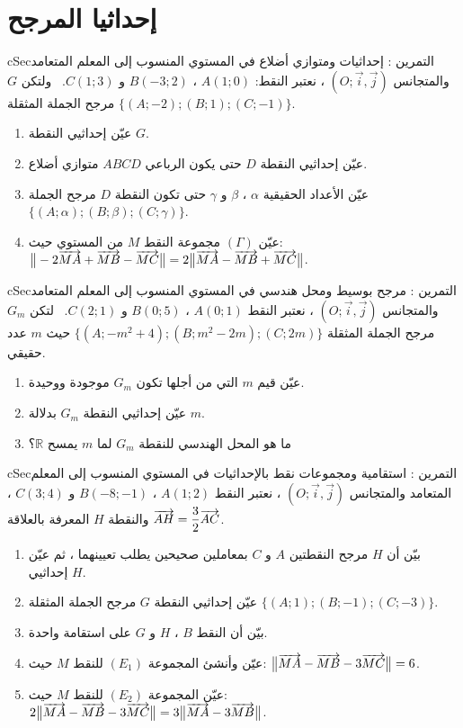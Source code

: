 \documentclass[12pt,a4paper]{article}
\newenvironment{BOX}[2]{\begin{otherlanguage}{english}\begin{arbox}{#1}{#2}}{\end{arbox}\end{otherlanguage}}
\newcounter{exo}
\newenvironment{tamrin}[1]{\stepcounter{exo}\begin{BOX}{cSec}{التمرين \theexo: #1}}{\end{BOX}}
\newcommand{\R}{\mathbb{R}}
\begin{document}
\section{إحداثيا المرجح}
\begin{tamrin}{إحداثيات ومتوازي أضلاع}
في المستوي المنسوب إلى المعلم المتعامد والمتجانس $(O;\vec i,\vec j)$ ، نعتبر النقط: $A(1;0)$ ، $B(-3;2)$ و $C(1;3)$. \ ولتكن $G$ مرجح الجملة المثقلة $\{(A;-2);(B;1);(C;-1)\}$.
\begin{enumerate}
\item عيّن إحداثيي النقطة $G$.
\item عيّن إحداثيي النقطة $D$ حتى يكون الرباعي $ABCD$ متوازي أضلاع.
\item عيّن الأعداد الحقيقية $\alpha$ ، $\beta$ و $\gamma$ حتى تكون النقطة $D$ مرجح الجملة $\{(A;\alpha);(B;\beta);(C;\gamma)\}$.
\item عيّن $(\Gamma)$ مجموعة النقط $M$ من المستوي حيث: $\big\|-2\overrightarrow{MA}+\overrightarrow{MB}-\overrightarrow{MC}\big\|=2\big\|\overrightarrow{MA}-\overrightarrow{MB}+\overrightarrow{MC}\big\|$.
\end{enumerate}
\end{tamrin}

\begin{tamrin}{مرجح بوسيط ومحل هندسي}
في المستوي المنسوب إلى المعلم المتعامد والمتجانس $(O;\vec i,\vec j)$ ، نعتبر النقط $A(0;1)$ ، $B(0;5)$ و $C(2;1)$. \ لتكن $G_m$ مرجح الجملة المثقلة $\{(A;-m^2+4);(B;m^2-2m);(C;2m)\}$ حيث $m$ عدد حقيقي.
\begin{enumerate}
\item عيّن قيم $m$ التي من أجلها تكون $G_m$ موجودة ووحيدة.
\item عيّن إحداثيي النقطة $G_m$ بدلالة $m$.
\item ما هو المحل الهندسي للنقطة $G_m$ لما $m$ يمسح $\R$؟
\end{enumerate}
\end{tamrin}

\begin{tamrin}{استقامية ومجموعات نقط بالإحداثيات}
في المستوي المنسوب إلى المعلم المتعامد والمتجانس $(O;\vec i,\vec j)$ ، نعتبر النقط $A(1;2)$ ، $B(-8;-1)$ و $C(3;4)$ ، والنقطة $H$ المعرفة بالعلاقة $\overrightarrow{AH}=\dfrac32\overrightarrow{AC}$.
\begin{enumerate}
\item بيّن أن $H$ مرجح النقطتين $A$ و $C$ بمعاملين صحيحين يطلب تعيينهما ، ثم عيّن إحداثيي $H$.
\item عيّن إحداثيي النقطة $G$ مرجح الجملة المثقلة $\{(A;1);(B;-1);(C;-3)\}$.
\item بيّن أن النقط $B$ ، $H$ و $G$ على استقامة واحدة.
\item عيّن وأنشئ المجموعة $(E_1)$ للنقط $M$ حيث: $\big\|\overrightarrow{MA}-\overrightarrow{MB}-3\overrightarrow{MC}\big\|=6$.
\item عيّن المجموعة $(E_2)$ للنقط $M$ حيث: $2\big\|\overrightarrow{MA}-\overrightarrow{MB}-3\overrightarrow{MC}\big\|=3\big\|\overrightarrow{MA}-3\overrightarrow{MB}\big\|$.
\end{enumerate}
\end{tamrin}
\end{document}
